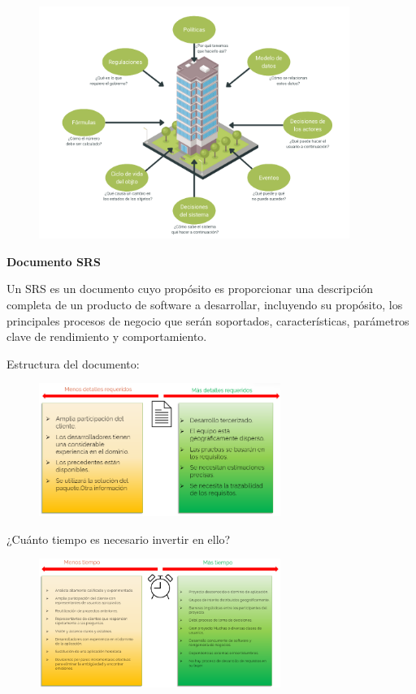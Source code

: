         \begin{figure}[h]
            \centering
            \includegraphics[width=0.9\textwidth]{imgs/9.png}
        \end{figure}
        
        \newpage
        
        \textbf{Documento SRS}
        
        Un SRS es un documento cuyo propósito es proporcionar una descripción completa de un producto de software a desarrollar, incluyendo su propósito, los principales procesos de negocio que serán soportados, características, parámetros clave de rendimiento y comportamiento.
        
        Estructura del documento:
        
        \begin{figure}[h]
            \centering
            \includegraphics[width=0.7\textwidth]{imgs/10.png}
        \end{figure}
    
        ¿Cuánto tiempo es necesario invertir en ello?
        
        \begin{figure}[h]
            \centering
            \includegraphics[width=0.7\textwidth]{imgs/11.png}
        \end{figure}
        
